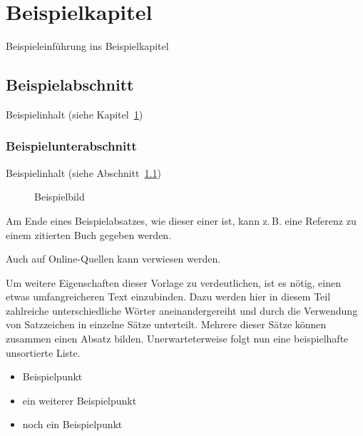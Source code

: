 \documentclass[
	paper=a4, %
	fontsize=11pt, %
	parskip=half, %
	DIV=15, %
	BCOR=22.5mm, %
	headsepline, %
	numbers=noenddot, %
	toc=bibliography %
]{scrbook} %
\newcommand{\zb}{z.\,B.} %
\begin{document}
\cleardoublepage
\tableofcontents


\mainmatter


\chapter{Beispielkapitel}
\label{chap:beispielkapitel}

Beispieleinführung ins Beispielkapitel


\section{Beispielabschnitt}
\label{sec:beispielabschnitt}

Beispielinhalt (siehe Kapitel~\ref{chap:beispielkapitel})


\subsection{Beispielunterabschnitt}
\label{subsec:beispielunterabschnitt}

Beispielinhalt (siehe Abschnitt~\ref{sec:beispielabschnitt})

\begin{figure}[H] %
\centering{}
\caption{Beispielbild}
\label{fig:beispielbild}
\end{figure}

Am Ende eines Beispielabsatzes, wie dieser einer ist, kann \zb{} eine Referenz zu einem zitierten Buch gegeben werden. \parencite[][]{beispiel:2015}

Auch auf Online-Quellen kann verwiesen werden. \parencite[][]{obeispiel}

Um weitere Eigenschaften dieser Vorlage zu verdeutlichen, ist es nötig, einen etwas umfangreicheren Text einzubinden. Dazu werden hier in diesem Teil zahlreiche unterschiedliche Wörter aneinandergereiht und durch die Verwendung von Satzzeichen in einzelne Sätze unterteilt. Mehrere dieser Sätze können zusammen einen Absatz bilden. Unerwarteterweise folgt nun eine beispielhafte unsortierte Liste.

\begin{itemize} \itemsep0pt \parskip0pt
\item Beispielpunkt
\item ein weiterer Beispielpunkt
\item noch ein Beispielpunkt
\end{itemize}
\end{document}
